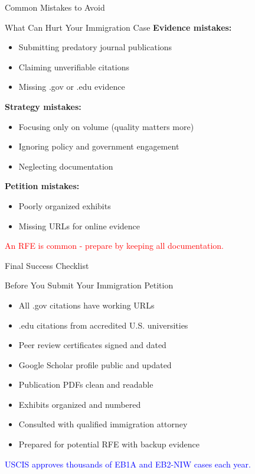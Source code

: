 \documentclass[11pt]{beamer}
\begin{document}
	\begin{frame}{Common Mistakes to Avoid}
		\small
		\begin{block}{What Can Hurt Your Immigration Case}
			\textbf{Evidence mistakes:}
			\begin{itemize}
				\item Submitting predatory journal publications
				\item Claiming unverifiable citations
				\item Missing .gov or .edu evidence
			\end{itemize}
			\textbf{Strategy mistakes:}
			\begin{itemize}
				\item Focusing only on volume (quality matters more)
				\item Ignoring policy and government engagement
				\item Neglecting documentation
			\end{itemize}
			\textbf{Petition mistakes:}
			\begin{itemize}
				\item Poorly organized exhibits
				\item Missing URLs for online evidence
			\end{itemize}
			\textcolor{red}{An RFE is common - prepare by keeping all documentation.}
		\end{block}
	\end{frame}
	
	\begin{frame}{Final Success Checklist}
		\small
		\begin{block}{Before You Submit Your Immigration Petition}
			\begin{itemize}
				\item [$\square$] All .gov citations have working URLs
				\item [$\square$] .edu citations from accredited U.S. universities
				\item [$\square$] Peer review certificates signed and dated
				\item [$\square$] Google Scholar profile public and updated
				\item [$\square$] Publication PDFs clean and readable
				\item [$\square$] Exhibits organized and numbered
				\item [$\square$] Consulted with qualified immigration attorney
				\item [$\square$] Prepared for potential RFE with backup evidence
			\end{itemize}
			\textcolor{blue}{USCIS approves thousands of EB1A and EB2-NIW cases each year.}
		\end{block}
	\end{frame}
	
\end{document}
